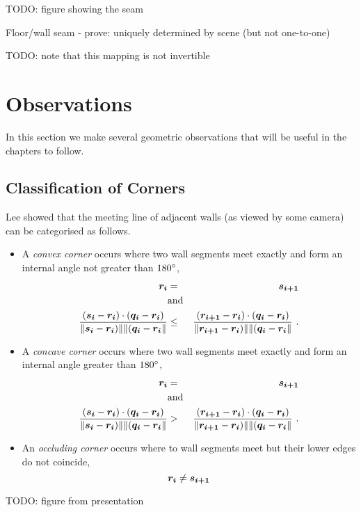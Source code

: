TODO: figure showing the seam

Floor/wall seam
  - prove: uniquely determined by scene (but not one-to-one)

TODO: note that this mapping is not invertible

\section{Observations}

In this section we make several geometric observations that will be
useful in the chapters to follow.

\subsection{Classification of Corners}
\label{sec:corner-categories}

Lee \etal \cite{Lee09} showed that the meeting line of adjacent walls
(as viewed by some camera) can be categorised as follows.
\begin{itemize}
  \item{A \textit{convex corner} occurs where two wall segments meet
    exactly and form an internal angle not greater than $180\degrees$, \ie
    \begin{eqnarray}
      \vect{r_i} &=& \vect{s_{i+1}}\\
      &\mbox{and}&\\
      \frac{(\vect{s_i}-\vect{r_i})\cdot(\vect{q_i}-\vect{r_i})}
           {\|\vect{s_i}-\vect{r_i})\|\|(\vect{q_i}-\vect{r_i}\|}
      &\leq&
      \frac{(\vect{r_{i+1}}-\vect{r_i})\cdot(\vect{q_i}-\vect{r_i})}
           {\|\vect{r_{i+1}}-\vect{r_i})\|\|(\vect{q_i}-\vect{r_i}\|} ~.
    \end{eqnarray}
  }
  \item{A \textit{concave corner} occurs where two wall segments meet
    exactly and form an internal angle greater than $180\degrees$, \ie
    \begin{eqnarray}
      \vect{r_i} &=& \vect{s_{i+1}}\\
      &\mbox{and}&\\
      \frac{(\vect{s_i}-\vect{r_i})\cdot(\vect{q_i}-\vect{r_i})}
           {\|\vect{s_i}-\vect{r_i})\|\|(\vect{q_i}-\vect{r_i}\|}
      &>&
      \frac{(\vect{r_{i+1}}-\vect{r_i})\cdot(\vect{q_i}-\vect{r_i})}
           {\|\vect{r_{i+1}}-\vect{r_i})\|\|(\vect{q_i}-\vect{r_i}\|} ~.
    \end{eqnarray}
  }
  \item{An \textit{occluding corner} occurs where to wall segments
    meet but their lower edges do not coincide, \ie
    \begin{equation}
      \vect{r_i} \neq \vect{s_{i+1}}
    \end{equation}
  }
\end{itemize}
TODO: figure from presentation

